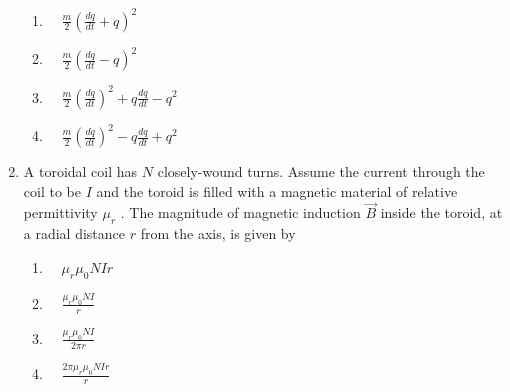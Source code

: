 \documentclass[journal]{IEEEtran}
\begin{document}
\begin{enumerate}
\begin{enumerate}
\item $ \quad \frac{m}{2} \left( \frac{dq}{dt} + q \right)^2 $
\item $ \quad \frac{m}{2} \left( \frac{dq}{dt} - q \right)^2 $
\item $ \quad \frac{m}{2} \left( \frac{dq}{dt} \right)^2 + q \frac{dq}{dt} - q^2 $
\item $ \quad \frac{m}{2} \left( \frac{dq}{dt} \right)^2 - q \frac{dq}{dt} + q^2 $
\end{enumerate}
\item A toroidal coil has  $N$  closely-wound turns. Assume the current through the coil to be $I$ and the toroid is filled with a magnetic material of relative permittivity $ \mu_r$ . The magnitude of magnetic induction $\vec{B} $ inside the toroid, at a radial distance $r$  from the axis, is given by

\begin{enumerate}
\item $ \quad \mu_r \mu_0 NIr $
\item $\quad \frac{\mu_r \mu_0 NI}{r} $
\item $ \quad \frac{\mu_r \mu_0 NI}{2 \pi r} $
\item $\quad \frac{2 \pi \mu_r \mu_0 NIr}{r} $
\end{enumerate}




\end{enumerate}
\end{document}
